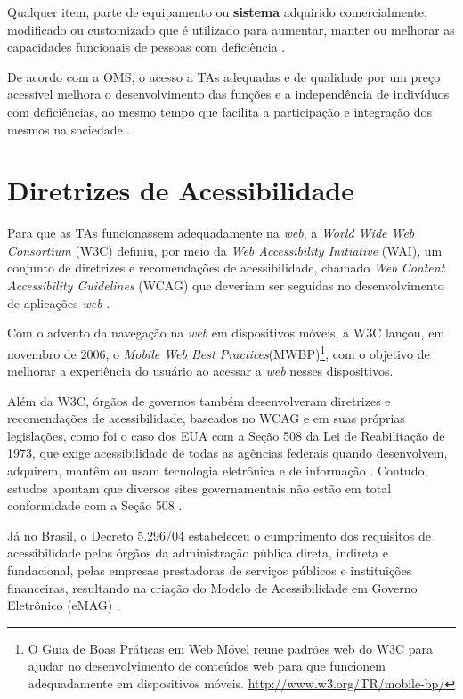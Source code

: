\begin{citacao}
    Qualquer item, parte de equipamento ou \textbf{sistema} adquirido comercialmente, modificado ou customizado que é utilizado para aumentar, manter ou melhorar as capacidades
    funcionais de pessoas com deficiência \cite{Cook2014}.
\end{citacao}

De acordo com a OMS, o acesso a TAs adequadas e de qualidade por um preço acessível melhora
o desenvolvimento das funções e a independência de indivíduos com deficiências, ao mesmo tempo que facilita
a participação e integração dos mesmos na sociedade \cite{world2019global}.

\section{Diretrizes de Acessibilidade}

Para que as TAs funcionassem adequadamente na \emph{web}, a \textit{World Wide Web Consortium} (W3C) definiu, por meio da
\emph{Web Accessibility Initiative} (WAI), um conjunto de diretrizes e recomendações de acessibilidade, chamado
\emph{Web Content Accessibility Guidelines} (WCAG) que deveriam ser seguidas no desenvolvimento de aplicações \emph{web}
\cite{W3C2019}.

Com o advento da navegação na \emph{web} em dispositivos móveis, a W3C lançou, em novembro
de 2006, o \emph{Mobile Web Best Practices}(MWBP)\footnote{O Guia de Boas Práticas
em Web Móvel reune padrões web do W3C para ajudar no desenvolvimento de conteúdos web para
que funcionem adequadamente em dispositivos móveis. \url{http://www.w3.org/TR/mobile-bp/}}, com o objetivo de
melhorar a experiência do usuário ao acessar a \emph{web} nesses dispositivos.

Além da W3C, órgãos de governos também desenvolveram diretrizes e recomendações de acessibilidade, baseados no WCAG e
em suas próprias legislações, como foi o caso dos EUA com a Seção 508
da Lei de Reabilitação de 1973, que exige acessibilidade de todas as agências federais quando desenvolvem,
adquirem, mantêm ou usam tecnologia eletrônica e de informação \cite{JAEGER2006169}. Contudo, estudos apontam que diversos
sites governamentais não estão em total conformidade com a Seção 508 \cite{KING2016715,YI201575}.

Já no Brasil, o Decreto 5.296/04 estabeleceu o cumprimento dos requisitos de acessibilidade pelos
órgãos da administração pública direta, indireta e fundacional, pelas empresas prestadoras de
serviços públicos e instituições financeiras, resultando na criação do Modelo de Acessibilidade
em Governo Eletrônico (eMAG) \cite{EMAG_2007}.

